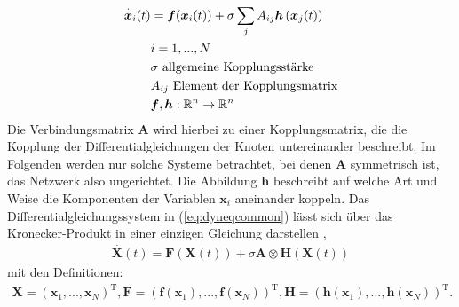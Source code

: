 \begin{align}\label{eq:dyneqcommon}
\overset{\cdot}{\boldsymbol{x}}_i(t)&=\boldsymbol{f}(\boldsymbol{x}_i(t))+\sigma\sum_j A_{ij}\boldsymbol{h}\left(\boldsymbol{x}_j(t)\right)
\\\notag & i=1,...,N
\\\notag & \sigma \text{ allgemeine Kopplungsstärke}
\\\notag & A_{ij}\text{ Element der Kopplungsmatrix}
\\\notag & \boldsymbol{f},\boldsymbol{h}:\mathbb{R}^n\rightarrow\mathbb{R}^n
\end{align}
Die Verbindungsmatrix $\boldsymbol{A}$ wird hierbei zu einer Kopplungsmatrix, die die Kopplung der Differentialgleichungen der Knoten untereinander beschreibt. Im Folgenden werden nur solche Systeme betrachtet, bei denen $\boldsymbol{A}$ symmetrisch ist, das Netzwerk also ungerichtet. Die Abbildung $\boldsymbol{h}$ beschreibt auf welche Art und Weise die Komponenten der Variablen $\boldsymbol{x}_i$ aneinander koppeln. Das Differentialgleichungssystem in (\ref*{eq:dyneqcommon}) lässt sich über das Kronecker-Produkt in einer einzigen Gleichung darstellen \cite{kronecker},
\begin{align}
\overset{\cdot}{\boldsymbol{X}}(t)=\boldsymbol{F}(\boldsymbol{X}(t))+\sigma\boldsymbol{A}\otimes\boldsymbol{H}(\boldsymbol{X}(t))
\end{align}
mit den Definitionen:
\begin{align*}
\boldsymbol{X}=\left(\boldsymbol{x}_1,...,\boldsymbol{x}_N\right)^{\text{T}},
\boldsymbol{F}=\left(\boldsymbol{f}(\boldsymbol{x}_1),...,\boldsymbol{f}(\boldsymbol{x}_N)\right)^{\text{T}},
\boldsymbol{H}=\left(\boldsymbol{h}(\boldsymbol{x}_1),...,\boldsymbol{h}(\boldsymbol{x}_N)\right)^{\text{T}}.
\end{align*}

